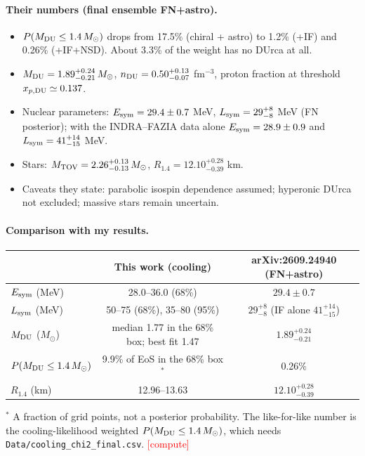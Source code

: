 \documentclass[11pt,a4paper]{article}
\newcommand{\fillin}[1]{\textcolor{red}{[#1]}}
\newcommand{\Esym}{E_{\rm sym}}
\newcommand{\Lsym}{L_{\rm sym}}
\newcommand{\Msun}{M_\odot}
\begin{document}
\paragraph{Their numbers (final ensemble FN+astro).}
\begin{itemize}
\item $P(M_{\rm DU}\le1.4\,\Msun)$ drops from 17.5\% (chiral + astro) to 1.2\% (+IF) and 0.26\% (+IF+NSD). About 3.3\% of the weight has no DUrca at all.
\item $M_{\rm DU}=1.89^{+0.24}_{-0.21}\,\Msun$, $n_{\rm DU}=0.50^{+0.13}_{-0.07}$ fm$^{-3}$, proton fraction at threshold $x_{p,\rm DU}\simeq0.137$.
\item Nuclear parameters: $\Esym=29.4\pm0.7$ MeV, $\Lsym=29^{+8}_{-8}$ MeV (FN posterior); with the INDRA--FAZIA data alone $\Esym=28.9\pm0.9$ and $\Lsym=41^{+14}_{-15}$ MeV.
\item Stars: $M_{\rm TOV}=2.26^{+0.13}_{-0.13}\,\Msun$, $R_{1.4}=12.10^{+0.28}_{-0.39}$ km.
\item Caveats they state: parabolic isospin dependence assumed; hyperonic DUrca not excluded; massive stars remain uncertain.
\end{itemize}

\paragraph{Comparison with my results.}
\begin{center}
\begin{tabular}{lcc}
\toprule
 & This work (cooling) & arXiv:2609.24940 (FN+astro)\\
\midrule
$\Esym$ (MeV) & 28.0--36.0 (68\%) & $29.4\pm0.7$\\
$\Lsym$ (MeV) & 50--75 (68\%), 35--80 (95\%) & $29^{+8}_{-8}$ (IF alone $41^{+14}_{-15}$)\\
$M_{\rm DU}$ ($\Msun$) & median 1.77 in the 68\% box; best fit 1.47 & $1.89^{+0.24}_{-0.21}$\\
$P(M_{\rm DU}\le1.4\,\Msun)$ & 9.9\% of EoS in the 68\% box$^*$ & 0.26\%\\
$R_{1.4}$ (km) & 12.96--13.63 & $12.10^{+0.28}_{-0.39}$\\
\bottomrule
\end{tabular}

\smallskip
{\footnotesize $^*$ A fraction of grid points, not a posterior probability. The like-for-like number is the cooling-likelihood weighted $P(M_{\rm DU}\le1.4\,\Msun)$, which needs \texttt{Data/cooling\_chi2\_final.csv}. \fillin{compute}}
\end{center}
\end{document}
